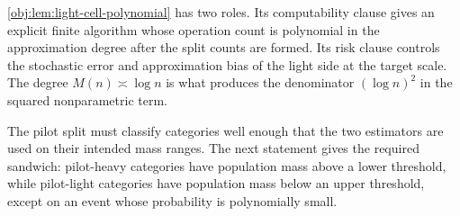 \cref{obj:lem:light-cell-polynomial} has two roles. Its computability clause gives an explicit finite algorithm whose operation count is polynomial in the approximation degree after the split counts are formed. Its risk clause controls the stochastic error and approximation bias of the light side at the target scale. The degree \(M(n)\asymp \log n\) is what produces the denominator \((\log n)^2\) in the squared nonparametric term.

The pilot split must classify categories well enough that the two estimators are used on their intended mass ranges. The next statement gives the required sandwich: pilot-heavy categories have population mass above a lower threshold, while pilot-light categories have population mass below an upper threshold, except on an event whose probability is polynomially small.

